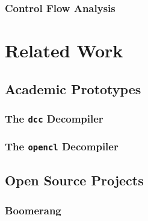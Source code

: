 \documentclass[12pt, a4paper]{article}
\begin{document}
\subsubsection{Control Flow Analysis}


\section{Related Work}


\subsection{Academic Prototypes}


\subsubsection{The \texttt{dcc} Decompiler}

\cite{rev_comp}


\subsubsection{The \texttt{opencl} Decompiler}

\cite{decomp_llvm}


\subsection{Open Source Projects}


\subsubsection{Boomerang}

\cite{boomerang}

\end{document}
